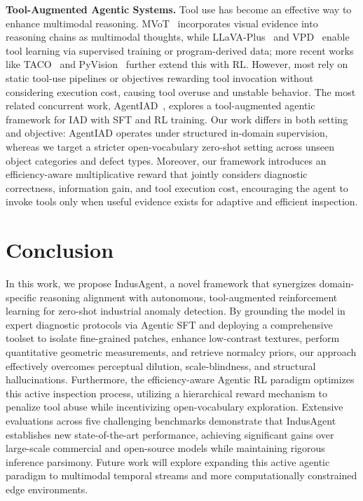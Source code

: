 \documentclass{llmxive}
\begin{document}
\textbf{Tool-Augmented Agentic Systems.}
Tool use has become an effective way to enhance multimodal reasoning. MVoT~\citep{li2025MVoT} incorporates visual evidence into reasoning chains as multimodal thoughts, while LLaVA-Plus~\citep{liu2023llavapluslearningusetools} and VPD~\citep{hu2024visual} enable tool learning via supervised training or program-derived data; more recent works like TACO~\citep{ma2024taco} and PyVision~\citep{zhao2025pyvision} further extend this with RL. However, most rely on static tool-use pipelines or objectives rewarding tool invocation without considering execution cost, causing tool overuse and unstable behavior. The most related concurrent work, AgentIAD~\citep{miao2025agentiad}, explores a tool-augmented agentic framework for IAD with SFT and RL training. Our work differs in both setting and objective: AgentIAD operates under structured in-domain supervision, whereas we target a stricter open-vocabulary zero-shot setting across unseen object categories and defect types. Moreover, our framework introduces an efficiency-aware multiplicative reward that jointly considers diagnostic correctness, information gain, and tool execution cost, encouraging the agent to invoke tools only when useful evidence exists for adaptive and efficient inspection.

\section{Conclusion}
In this work, we propose IndusAgent, a novel framework that synergizes domain-specific reasoning alignment with autonomous, tool-augmented reinforcement learning for zero-shot industrial anomaly detection. By grounding the model in expert diagnostic protocols via Agentic SFT and deploying a comprehensive toolset to isolate fine-grained patches, enhance low-contrast textures, perform quantitative geometric measurements, and retrieve normalcy priors, our approach effectively overcomes perceptual dilution, scale-blindness, and structural hallucinations. Furthermore, the efficiency-aware Agentic RL paradigm optimizes this active inspection process, utilizing a hierarchical reward mechanism to penalize tool abuse while incentivizing open-vocabulary exploration. Extensive evaluations across five challenging benchmarks demonstrate that IndusAgent establishes new state-of-the-art performance, achieving significant gains over large-scale commercial and open-source models while maintaining rigorous inference parsimony. Future work will explore expanding this active agentic paradigm to multimodal temporal streams and more computationally constrained edge environments.
\end{document}

